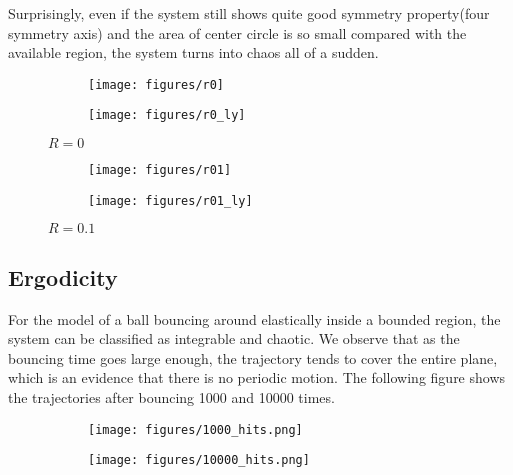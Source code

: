 \documentclass[12pt]{article}
\begin{document}
Surprisingly, even if the system still shows quite good symmetry property(four symmetry axis) and the area of center circle is so small compared with the available region, the system turns into chaos all of a sudden. 

\begin{figure}[H] 
  \begin{subfigure}[b]{0.4\textwidth}
    \texttt{[image: figures/r0]}
    \caption{}
    \label{fig:r0_1}
  \end{subfigure}
  \hfill
  \begin{subfigure}[b]{0.5\textwidth}
    \texttt{[image: figures/r0\_ly]}
    \caption{}
    \label{fig:r0_2}
  \end{subfigure}
  \caption{$R = 0$}
\end{figure}

\begin{figure}[H] 
  \begin{subfigure}[b]{0.4\textwidth}
    \texttt{[image: figures/r01]}
    \caption{}
    \label{fig:r01_1}
  \end{subfigure}
  \hfill
  \begin{subfigure}[b]{0.5\textwidth}
    \texttt{[image: figures/r01\_ly]}
    \caption{}
    \label{fig:r01_2}
  \end{subfigure}
  \caption{$R = 0.1$}
\end{figure}



\subsection*{Ergodicity}

For the model of a ball bouncing around elastically inside a bounded region, the system can be classified as integrable and chaotic. 
We observe that as the bouncing time goes large enough, the trajectory tends to cover the entire plane, which is an evidence that there is no periodic motion. The following figure shows the trajectories after bouncing 1000 and 10000 times.

\begin{figure}[H] 
  \begin{subfigure}[b]{0.45\textwidth}
    \texttt{[image: figures/1000\_hits.png]}
    \caption{}
  \end{subfigure}
  \hfill
  \begin{subfigure}[b]{0.4\textwidth}
    \texttt{[image: figures/10000\_hits.png]}
    \caption{}
  \end{subfigure}
\end{figure}
\end{document}
